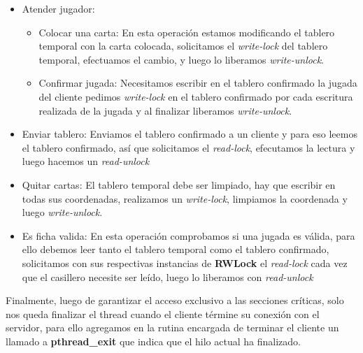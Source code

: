 \begin{itemize}
	\item Atender jugador:
		\begin{itemize}
			\item Colocar una carta: En esta operación estamos modificando el tablero temporal con la carta colocada, solicitamos el \textit{write-lock} del tablero temporal, efectuamos el cambio, y luego lo liberamos \textit{write-unlock}.
			\item Confirmar jugada: Necesitamos escribir en el tablero confirmado la jugada del cliente pedimos \textit{write-lock} en el tablero confirmado por cada escritura realizada de la jugada y al finalizar liberamos \textit{write-unlock}.
		\end{itemize}
	\item Enviar tablero: Enviamos el tablero confirmado a un cliente y para eso leemos el tablero confirmado, así que solicitamos el \textit{read-lock}, efecutamos la lectura y luego hacemos un \textit{read-unlock} 
	\item Quitar cartas: El tablero temporal debe ser limpiado, hay que escribir en todas sus coordenadas, realizamos un \textit{write-lock}, limpiamos la coordenada y luego \textit{write-unlock}.
	\item Es ficha valida: En esta operación comprobamos si una jugada es válida, para ello debemos leer tanto el tablero temporal como el tablero confirmado, solicitamos con sus respectivas instancias de \textbf{RWLock} el \textit{read-lock} cada vez que el casillero necesite ser leído, luego lo liberamos con \textit{read-unlock}
\end{itemize}

Finalmente, luego de garantizar el acceso exclusivo a las secciones críticas, solo nos queda finalizar el thread cuando el cliente términe su conexión con el servidor, para ello agregamos en la rutina encargada de terminar el cliente un llamado a \textbf{pthread\_exit} que indica que el hilo actual ha finalizado.

